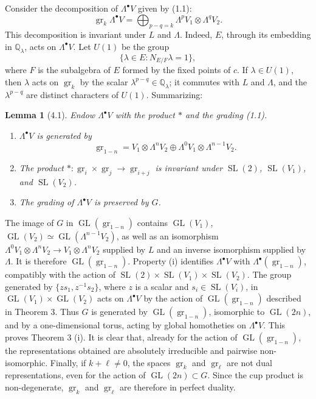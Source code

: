 \documentclass[11pt]{article}
\newcommand{\Q}{\mathbb Q}
\newcommand{\GL}{\operatorname{GL}}
\newcommand{\SL}{\operatorname{SL}}
\newcommand{\gr}{\operatorname{gr}}
\theoremstyle{deligne}
\newtheorem*{lemma*}{Lemma}
\begin{document}
\begin{enumerate}[label=(\alph*)]
Consider the decomposition of $\Lambda^\bullet V$ given by (1.1):
\[
\gr_k\Lambda^\bullet V=\bigoplus_{p-q=k}\Lambda^pV_1\otimes\Lambda^qV_2.
\]
This decomposition is invariant under $L$ and $\Lambda$. Indeed, $E$, through its embedding in $\Q_\lambda$, acts on $\Lambda^\bullet V$. Let $U(1)$ be the group
\[
\{\lambda\in E:N_{E/F}\lambda=1\},
\]
where $F$ is the subalgebra of $E$ formed by the fixed points of $c$. If $\lambda\in U(1)$, then $\lambda$ acts on $\gr_k$ by the scalar $\lambda^{p-q}\in\Q_\lambda$; it commutes with $L$ and $\Lambda$, and the $\lambda^{p-q}$ are distinct characters of $U(1)$. Summarizing:
\end{enumerate}

\begin{lemma*}[4.1]
Endow $\Lambda^\bullet V$ with the product $*$ and the grading (1.1).
\begin{enumerate}[label=(\roman*)]
\item $\Lambda^\bullet V$ is generated by
\[
\gr_{1-n}=V_1\otimes\Lambda^nV_2\oplus\Lambda^0V_1\otimes\Lambda^{n-1}V_2.
\]
\item The product $*: \gr_i\times\gr_j\to\gr_{i+j}$ is invariant under $\SL(2)$, $\SL(V_1)$, and $\SL(V_2)$.
\item The grading of $\Lambda^\bullet V$ is preserved by $G$.
\end{enumerate}
\end{lemma*}

The image of $G$ in $\GL(\gr_{1-n})$ contains $\GL(V_1)$, $\GL(V_2)\simeq\GL(\Lambda^{n-1}V_2)$, as well as an isomorphism $\Lambda^0V_1\otimes\Lambda^nV_2\to V_1\otimes\Lambda^nV_2$ supplied by $L$ and an inverse isomorphism supplied by $\Lambda$. It is therefore $\GL(\gr_{1-n})$. Property (i) identifies $\Lambda^\bullet V$ with $\Lambda^\bullet(\gr_{1-n})$, compatibly with the action of $\SL(2)\times\SL(V_1)\times\SL(V_2)$. The group generated by $\{zs_1,z^{-1}s_2\}$, where $z$ is a scalar and $s_i\in\SL(V_i)$, in $\GL(V_1)\times\GL(V_2)$ acts on $\Lambda^\bullet V$ by the action of $\GL(\gr_{1-n})$ described in Theorem 3. Thus $G$ is generated by $\GL(\gr_{1-n})$, isomorphic to $\GL(2n)$, and by a one-dimensional torus, acting by global homotheties on $\Lambda^\bullet V$. This proves Theorem 3 (i). It is clear that, already for the action of $\GL(\gr_{1-n})$, the representations obtained are absolutely irreducible and pairwise non-isomorphic. Finally, if $k+\ell\ne0$, the spaces $\gr_k$ and $\gr_\ell$ are not dual representations, even for the action of $\GL(2n)\subset G$. Since the cup product is non-degenerate, $\gr_k$ and $\gr_\ell$ are therefore in perfect duality.
\end{document}

